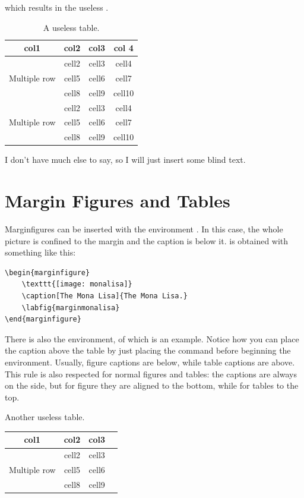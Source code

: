 which results in the useless .

\begin{table}[h]
\caption[A useless table]{A useless table.}
\begin{tabular}{ c c c c }
	\toprule
	col1 & col2 & col3 & col 4 \\
	\midrule
	\multirow{3}{4em}{Multiple row} & cell2 & cell3 & cell4\\ &
	cell5 & cell6 & cell7 \\ &
	cell8 & cell9 & cell10 \\
	\multirow{3}{4em}{Multiple row} & cell2 & cell3 & cell4 \\ &
	cell5 & cell6 & cell7 \\ &
	cell8 & cell9 & cell10 \\
	\bottomrule
\end{tabular}
\end{table}

I don't have much else to say, so I will just insert some blind text. 
\blindtext

\section{Margin Figures and Tables}

Marginfigures can be inserted with the environment 
. In this case, the whole picture is confined 
to the margin and the caption is below it.  is 
obtained with something like this:

\begin{lstlisting}
\begin{marginfigure}
	\texttt{[image: monalisa]}
	\caption[The Mona Lisa]{The Mona Lisa.}
	\labfig{marginmonalisa}
\end{marginfigure}
\end{lstlisting}

There is also the  environment, of which 
 is an example. Notice how you can place the 
caption above the table by just placing the  command 
before beginning the  environment. Usually, figure 
captions are below, while table captions are above. This rule is also 
respected for normal figures and tables: the captions are always on the 
side, but for figure they are aligned to the bottom, while for tables to 
the top.

\begin{margintable}
\caption[Another useless table]{Another useless table.}
\raggedright
\begin{tabular}{ c c c c }
	\hline
	col1 & col2 & col3 \\
	\hline
	\multirow{3}{4em}{Multiple row} & cell2 & cell3 \\ & cell5 & cell6 
	\\ & cell8 & cell9 \\ \hline
\end{tabular}
\end{margintable}

